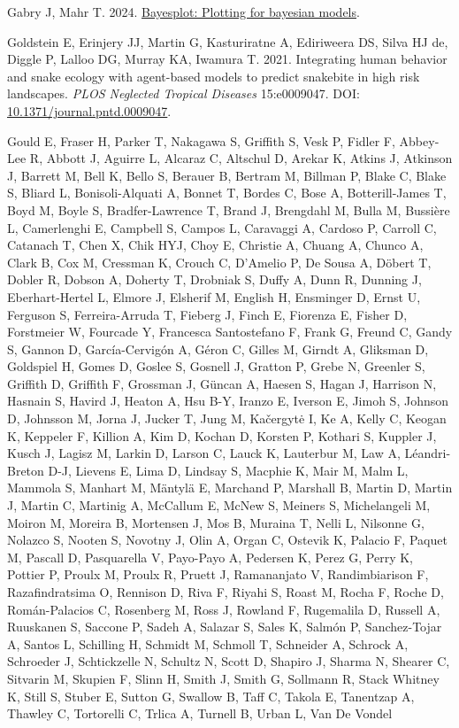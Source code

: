 \documentclass[10pt,a4paper]{article}
\newlength{\cslhangindent}
\newenvironment{CSLReferences}[2] %
 {\begin{list}{}{%
  \setlength{\itemindent}{0pt}
  \setlength{\leftmargin}{0pt}
  \setlength{\parsep}{0pt}
  \ifodd #1
   \setlength{\leftmargin}{\cslhangindent}
   \setlength{\itemindent}{-1\cslhangindent}
  \fi
  \setlength{\itemsep}{#2\baselineskip}}}
 {\end{list}}
\begin{document}
\begin{CSLReferences}{1}{0}
Gabry J, Mahr T. 2024. \href{https://mc-stan.org/bayesplot/}{Bayesplot: Plotting for bayesian models}.

Goldstein E, Erinjery JJ, Martin G, Kasturiratne A, Ediriweera DS, Silva HJ de, Diggle P, Lalloo DG, Murray KA, Iwamura T. 2021. Integrating human behavior and snake ecology with agent-based models to predict snakebite in high risk landscapes. \emph{PLOS Neglected Tropical Diseases} 15:e0009047. DOI: \href{https://doi.org/10.1371/journal.pntd.0009047}{10.1371/journal.pntd.0009047}.

Gould E, Fraser H, Parker T, Nakagawa S, Griffith S, Vesk P, Fidler F, Abbey-Lee R, Abbott J, Aguirre L, Alcaraz C, Altschul D, Arekar K, Atkins J, Atkinson J, Barrett M, Bell K, Bello S, Berauer B, Bertram M, Billman P, Blake C, Blake S, Bliard L, Bonisoli-Alquati A, Bonnet T, Bordes C, Bose A, Botterill-James T, Boyd M, Boyle S, Bradfer-Lawrence T, Brand J, Brengdahl M, Bulla M, Bussière L, Camerlenghi E, Campbell S, Campos L, Caravaggi A, Cardoso P, Carroll C, Catanach T, Chen X, Chik HYJ, Choy E, Christie A, Chuang A, Chunco A, Clark B, Cox M, Cressman K, Crouch C, D'Amelio P, De Sousa A, Döbert T, Dobler R, Dobson A, Doherty T, Drobniak S, Duffy A, Dunn R, Dunning J, Eberhart-Hertel L, Elmore J, Elsherif M, English H, Ensminger D, Ernst U, Ferguson S, Ferreira-Arruda T, Fieberg J, Finch E, Fiorenza E, Fisher D, Forstmeier W, Fourcade Y, Francesca Santostefano F, Frank G, Freund C, Gandy S, Gannon D, García-Cervigón A, Géron C, Gilles M, Girndt A, Gliksman D, Goldspiel H, Gomes D, Goslee S, Gosnell J, Gratton P, Grebe N, Greenler S, Griffith D, Griffith F, Grossman J, Güncan A, Haesen S, Hagan J, Harrison N, Hasnain S, Havird J, Heaton A, Hsu B-Y, Iranzo E, Iverson E, Jimoh S, Johnson D, Johnsson M, Jorna J, Jucker T, Jung M, Kačergytė I, Ke A, Kelly C, Keogan K, Keppeler F, Killion A, Kim D, Kochan D, Korsten P, Kothari S, Kuppler J, Kusch J, Lagisz M, Larkin D, Larson C, Lauck K, Lauterbur M, Law A, Léandri-Breton D-J, Lievens E, Lima D, Lindsay S, Macphie K, Mair M, Malm L, Mammola S, Manhart M, Mäntylä E, Marchand P, Marshall B, Martin D, Martin J, Martin C, Martinig A, McCallum E, McNew S, Meiners S, Michelangeli M, Moiron M, Moreira B, Mortensen J, Mos B, Muraina T, Nelli L, Nilsonne G, Nolazco S, Nooten S, Novotny J, Olin A, Organ C, Ostevik K, Palacio F, Paquet M, Pascall D, Pasquarella V, Payo-Payo A, Pedersen K, Perez G, Perry K, Pottier P, Proulx M, Proulx R, Pruett J, Ramananjato V, Randimbiarison F, Razafindratsima O, Rennison D, Riva F, Riyahi S, Roast M, Rocha F, Roche D, Román-Palacios C, Rosenberg M, Ross J, Rowland F, Rugemalila D, Russell A, Ruuskanen S, Saccone P, Sadeh A, Salazar S, Sales K, Salmón P, Sanchez-Tojar A, Santos L, Schilling H, Schmidt M, Schmoll T, Schneider A, Schrock A, Schroeder J, Schtickzelle N, Schultz N, Scott D, Shapiro J, Sharma N, Shearer C, Sitvarin M, Skupien F, Slinn H, Smith J, Smith G, Sollmann R, Stack Whitney K, Still S, Stuber E, Sutton G, Swallow B, Taff C, Takola E, Tanentzap A, Thawley C, Tortorelli C, Trlica A, Turnell B, Urban L, Van De Vondel 
\end{CSLReferences}
\end{document}
